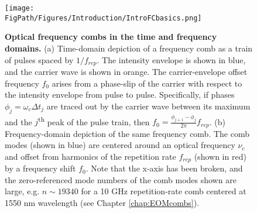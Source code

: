 \begin{figure}[htpb]
	\begin{center}
		\texttt{[image: \\FigPath/Figures/Introduction/IntroFCbasics.png]}
	\end{center}
	\caption[Optical frequency combs in the time and frequency domains]{\textbf{Optical frequency combs in the time and frequency domains.} (a) Time-domain depiction of a frequency comb as a train of pulses spaced by $1/f_{rep}$. The intensity envelope is shown in blue, and the carrier wave is shown in orange. The carrier-envelope offset frequency $f_0$ arises from a phase-slip of the carrier with respect to the intensity envelope from pulse to pulse. Specifically, if phases $\phi_j=\omega_c\Delta t_j$ are traced out by the carrier wave between its maximum and the $j$\textsuperscript{th} peak of the pulse train, then $f_0=\frac{\phi_{j+1}-\phi_j}{2\pi}f_{rep}$. (b) Frequency-domain depiction of the same frequency comb. The comb modes (shown in blue) are centered around an optical frequency $\nu_c$ and offset from harmonics of the repetition rate $f_{rep}$ (shown in red) by a frequency shift $f_0$. Note that the x-axis has been broken, and the zero-referenced mode numbers of the comb modes shown are large, e.g. $n\sim19340$ for a 10 GHz repetition-rate comb centered at 1550 nm wavelength (see Chapter \ref{chap:EOMcombs}). }
	\label{fig:CombBasics}
\end{figure} 

